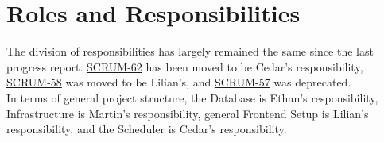 \section{Roles and Responsibilities}
The division of responsibilities has largely remained the same since the last progress report.
\href{https://unixusergroup.atlassian.net/browse/SCRUM-62}{SCRUM-62} has been moved to be Cedar's responsibility, \href{https://unixusergroup.atlassian.net/browse/SCRUM-58}{SCRUM-58} was moved to be Lilian's, and \href{https://unixusergroup.atlassian.net/browse/SCRUM-57}{SCRUM-57} was deprecated. \\

In terms of general project structure, the Database is Ethan's responsibility, Infrastructure is Martin's responsibility, general Frontend Setup is Lilian's responsibility, and the Scheduler is Cedar's responsibility. \\
